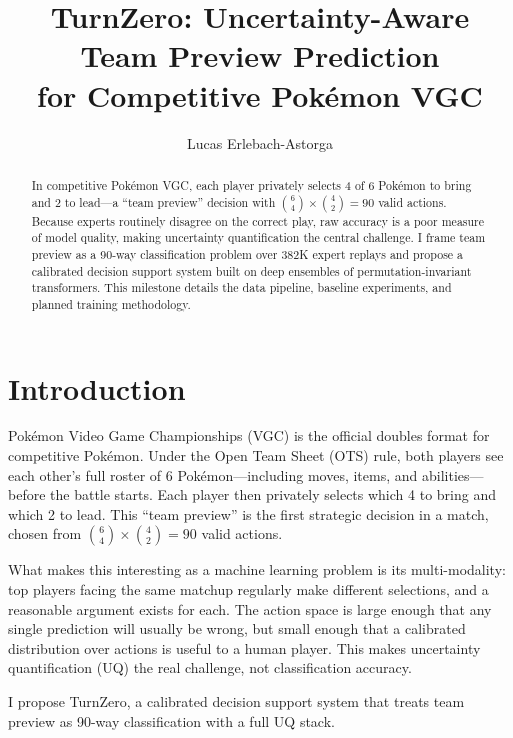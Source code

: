 \documentclass[11pt]{article}
\title{TurnZero: Uncertainty-Aware Team Preview Prediction\\for Competitive Pok\'emon VGC}
\author{Lucas Erlebach-Astorga}
\begin{document}
\maketitle

\begin{abstract}
In competitive Pok\'emon VGC, each player privately selects 4 of 6 Pok\'emon to bring and 2 to lead---a ``team preview'' decision with $\binom{6}{4}\times\binom{4}{2}=90$ valid actions.
Because experts routinely disagree on the correct play, raw accuracy is a poor measure of model quality, making uncertainty quantification the central challenge.
I frame team preview as a 90-way classification problem over 382K expert replays and propose a calibrated decision support system built on deep ensembles of permutation-invariant transformers.
This milestone details the data pipeline, baseline experiments, and planned training methodology.
\end{abstract}


\section{Introduction}
\label{sec:intro}

Pok\'emon Video Game Championships (VGC) is the official doubles format for competitive Pok\'emon.
Under the Open Team Sheet (OTS) rule, both players see each other's full roster of 6 Pok\'emon---including moves, items, and abilities---before the battle starts.
Each player then privately selects which 4 to bring and which 2 to lead.
This ``team preview'' is the first strategic decision in a match, chosen from $\binom{6}{4}\times\binom{4}{2}=90$ valid actions.

What makes this interesting as a machine learning problem is its multi-modality: top players facing the same matchup regularly make different selections, and a reasonable argument exists for each.
The action space is large enough that any single prediction will usually be wrong, but small enough that a calibrated distribution over actions is useful to a human player.
This makes uncertainty quantification (UQ) the real challenge, not classification accuracy.

I propose TurnZero, a calibrated decision support system that treats team preview as 90-way classification with a full UQ stack.
\end{document}
